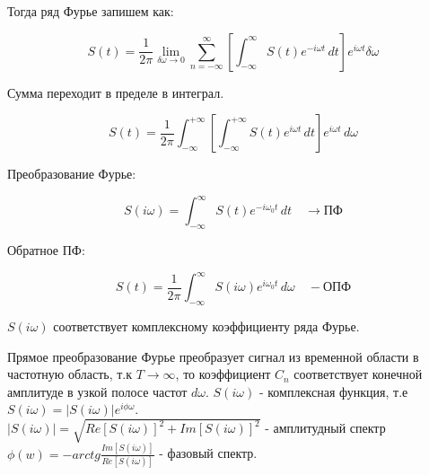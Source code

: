 Тогда ряд Фурье запишем как:

\[
S(t) = \frac{1}{2\pi} \lim_{\delta \omega \rightarrow 0} \sum_{n=-\infty}^{\infty} \left[ \int_{-\infty}^{\infty} S(t)e^{-i\omega t} \, dt \right] e^{i\omega t} \delta \omega
\]

Сумма переходит в пределе в интеграл.

\[
S(t) = \frac{1}{2\pi} \int_{-\infty}^{+\infty} \left[ \int_{-\infty}^{+\infty} S(t)e^{i\omega t} \, dt \right] e^{i\omega t} \, d\omega
\]

Преобразование Фурье:

\[
S(i\omega) = \int_{-\infty}^{\infty} S(t)e^{-i\omega_0t} \, dt \quad \rightarrow \text{ПФ}
\]

Обратное ПФ:

\[
S(t) = \frac{1}{2\pi} \int_{-\infty}^{\infty} S(i\omega)e^{i\omega_0t} \, d\omega \quad - \text{ОПФ}
\]

$S(i\omega)$ соответствует комплексному коэффициенту ряда Фурье.

Прямое преобразование Фурье преобразует сигнал из временной области в частотную область, т.к $T \to \infty$, то коэффициент $C_n$ соответствует конечной амплитуде в 
узкой полосе частот $d\omega$. $S(i\omega)$ - комплексная функция, т.е $S(i\omega) = |S(i\omega)|e^{i\phi\omega}$. \\

$|S(i\omega)| = \sqrt{Re[S(i\omega)]^2 + Im[S(i\omega)]^2}$ - амплитудный спектр \\

$\phi(w) = -arctg\frac{Im[S(i\omega)]}{Re[S(i\omega)]}$ - фазовый спектр.




\endinput